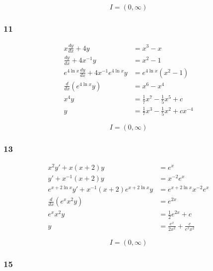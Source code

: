 \documentclass{article}
\begin{document}
\[I = (0, \infty)\]

\subsubsection{11}

\begin{align*}
  x \frac{d y}{d x} + 4 y                              & = x^3 - x                                      \\
  \frac{d y}{d x} + 4 x^{-1} y                         & = x^2 - 1                                      \\
  e^{4 \ln x} \frac{d y}{d x} + 4 x^{-1} e^{4 \ln x} y & = e^{4 \ln x} (x^2 - 1)                        \\
  \frac{d}{d x} (e^{4 \ln x} y)                        & = x^6 - x^4                                    \\
  x^4 y                                                & = \frac{1}{7} x^7 - \frac{1}{5} x^5 + c        \\
  y                                                    & = \frac{1}{7} x^3 - \frac{1}{5} x^2 + c x^{-4}
\end{align*}

\[I = (0, \infty)\]

\subsubsection{13}

\begin{align*}
  x^2 y' + x (x + 2) y                                  & = e^x                                   \\
  y' + x^{-1} (x + 2) y                                 & = x^{-2} e^x                            \\
  e^{x + 2 \ln x} y' + x^{-1} (x + 2) e^{x + 2 \ln x} y & = e^{x + 2 \ln x} x^{-2} e^x            \\
  \frac{d}{d x} (e^x x^2 y)                             & = e^{2 x}                               \\
  e^x x^2 y                                             & = \frac{1}{2} e^{2 x} + c               \\
  y                                                     & = \frac{e^x}{2 x^2} + \frac{c}{e^x x^2}
\end{align*}

\[I = (0, \infty)\]

\subsubsection{15}
\end{document}
